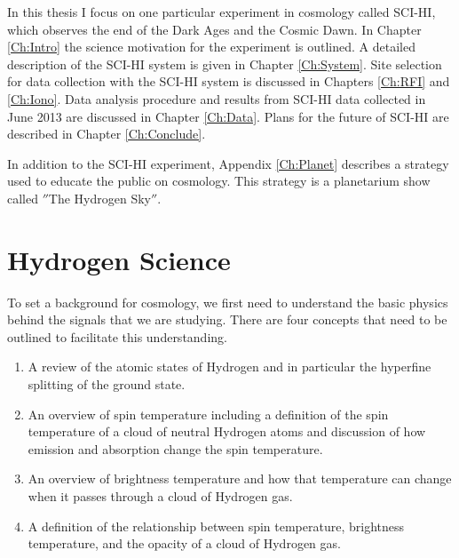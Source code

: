 In this thesis I focus on one particular experiment in \cm cosmology called SCI-HI, which observes the end of the Dark Ages and the Cosmic Dawn. In Chapter \ref{Ch:Intro} the science motivation for the experiment is outlined. A detailed description of the SCI-HI system is given in Chapter \ref{Ch:System}. Site selection for data collection with the SCI-HI system is discussed in Chapters \ref{Ch:RFI} and \ref{Ch:Iono}. Data analysis procedure and results from SCI-HI data collected in June 2013 are discussed in Chapter \ref{Ch:Data}. Plans for the future of SCI-HI are described in Chapter \ref{Ch:Conclude}. 

In addition to the SCI-HI experiment, Appendix \ref{Ch:Planet} describes a strategy used to educate the public on \cm cosmology. This strategy is a planetarium show called $''$The Hydrogen Sky$''$. 



\section{Hydrogen \cm Science}

To set a background for \cm cosmology, we first need to understand the basic physics behind the signals that we are studying. There are four concepts that need to be outlined to facilitate this understanding. 

\begin{enumerate}

\item A review of the atomic states of Hydrogen and in particular the \cm hyperfine splitting of the ground state. 

\item An overview of spin temperature including a definition of the spin temperature of a cloud of neutral Hydrogen atoms and discussion of how emission and absorption change the spin temperature. 

\item An overview of brightness temperature and how that temperature can change when it passes through a cloud of Hydrogen gas. 

\item A definition of the relationship between spin temperature, brightness temperature, and the opacity of a cloud of Hydrogen gas. 

\end{enumerate}

